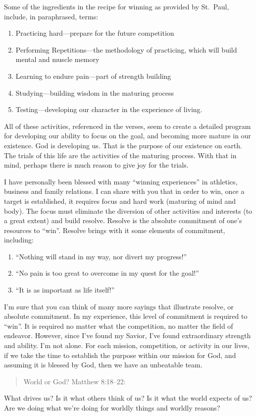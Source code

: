 \documentclass[12pt]{memoir}
\begin{document}
Some of the ingredients in the recipe for winning as provided by St.~Paul, include, in paraphrased, terms: 
\begin{enumerate}
\item Practicing hard---prepare for the future competition 
\item Performing Repetitions---the methodology of practicing, which will
build mental and muscle memory 
\item Learning to endure pain---part of strength building 
\item Studying---building wisdom in the maturing process 
\item Testing---developing our character in the experience of living. 
\end{enumerate}
All of these activities, referenced in the verses, seem to create
a detailed program for developing our ability to focus on the goal,
and becoming more mature in our existence. God is developing us. That
is the purpose of our existence on earth. The trials of this life
are the activities of the maturing process. With that in mind, perhaps
there is much reason to give joy for the trials. 

I have personally been blessed with many ``winning experiences''
in athletics, business and family relations. I can share with you
that in order to win, once a target is established, it requires focus
and hard work (maturing of mind and body). The focus must eliminate
the diversion of other activities and interests (to a great extent)
and build resolve. Resolve is the absolute commitment of one's resources
to ``win''. Resolve brings with it some elements of commitment,
including: 
\begin{enumerate}
\item ``Nothing will stand in my way, nor divert my progress!'' 
\item ``No pain is too great to overcome in my quest for the goal!'' 
\item ``It is as important as life itself!'' 
\end{enumerate}
I'm sure that you can think of many more sayings that illustrate resolve,
or absolute commitment. In my experience, this level of commitment
is required to ``win''. It is required no matter what the competition,
no matter the field of endeavor. However, since I've found my Savior,
I've found extraordinary strength and ability. I'm not alone. For
each mission, competition, or activity in our lives, if we take the
time to establish the purpose within our mission for God, and assuming
it is blessed by God, then we have an unbeatable team.  
\begin{quote}
World or God? Matthew 8:18--22:
\end{quote}
What drives us? Is it what others think of us? Is it what the world
expects of us? Are we doing what we're doing for worldly things and
worldly reasons? 
\end{document}
